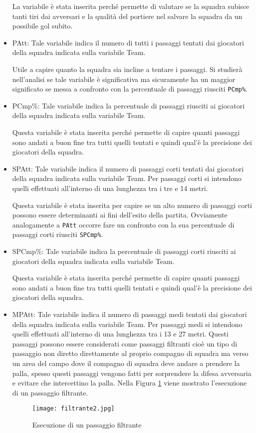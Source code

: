 \begin{itemize}
	La variabile è stata inserita perché permette di valutare se la squadra subisce tanti tiri dai avversari e la qualità del portiere nel salvare la squadra da un possibile gol subito.
	\item \textsf{PAtt}: Tale variabile indica il numero di tutti i passaggi tentati dai giocatori della squadra indicata sulla variabile \textsf{Team}. 
	
	Utile a capire quanto la squadra sia incline a tentare i passaggi. Si studierà nell'analisi se tale variabile è significativa ma sicuramente ha un maggior significato se messa a confronto con la percentuale di passaggi riusciti \texttt{PCmp\%}.
	\item\textsf{PCmp\%}: Tale variabile indica la percentuale di passaggi riusciti ai giocatori della squadra indicata sulla variabile \textsf{Team}. 
	
	Questa variabile è stata inserita perché permette di capire quanti passaggi sono andati a buon fine tra tutti quelli tentati e quindi qual'è la precisione dei giocatori della squadra.
	\item \textsf{SPAtt}: Tale variabile indica il numero di passaggi corti tentati dai giocatori della squadra indicata sulla variabile \textsf{Team}. Per passaggi corti si intendono quelli effettuati all'interno di una lunghezza tra i tre e 14 metri.
	
	Questa variabile è stata inserita per capire se un alto numero di passaggi corti possono essere determinanti ai fini dell'esito della partita. Ovviamente analogamente a \texttt{PAtt} occorre fare un confronto con la sua percentuale di passaggi corti riusciti \texttt{SPCmp\%}.
	\item \textsf{SPCmp\%}: Tale variabile indica la percentuale di passaggi corti riusciti ai giocatori della squadra indicata sulla variabile \textsf{Team}. 
	
	Questa variabile è stata inserita perché permette di capire quanti passaggi sono andati a buon fine tra tutti quelli tentati e quindi qual'è la precisione dei giocatori della squadra.
	\item \textsf{MPAtt}: Tale variabile indica il numero di passaggi medi tentati dai giocatori della squadra indicata sulla variabile \textsf{Team}. Per passaggi medi si intendono quelli effettuati all'interno di una lunghezza tra i 13 e 27 metri. Questi passaggi possono essere considerati come passaggi filtranti cioè un tipo di passaggio non diretto direttamente al proprio compagno di squadra ma verso un area del campo dove il compagno di squadra deve andare a prendere la palla, spesso questi passaggi vengono fatti per sorprendere la difesa avversaria e evitare che intercettino la palla. Nella Figura \ref{fig:filt} viene mostrato l'esecuzione di un passaggio filtrante.
	\begin{figure}[ht]
		\begin{center}
			\texttt{[image: filtrante2.jpg]}
			\caption{Esecuzione di un passaggio filtrante} \label{fig:filt}
		\end{center}
	\end{figure}


\end{itemize}
